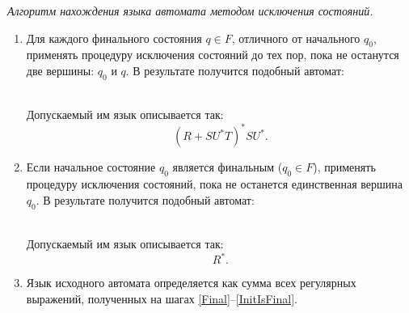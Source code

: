 \renewcommand{\labelenumi}{\theenumi .}
\emph{Алгоритм нахождения языка автомата методом исключения состояний.}
\begin{enumerate}
  \item\label{Final} Для каждого финального состояния $q\in F$, отличного от
  начального $q_0$, применять процедуру исключения состояний до тех пор, пока не останутся
  две вершины: $q_0$ и $q$. В результате получится подобный автомат:\\ 
  \\
Допускаемый им язык описывается так: $$(R+SU^{\ast}T)^{\ast}SU^{\ast}.$$

\item\label{InitIsFinal} Если начальное состояние $q_0$ является финальным
($q_0\in F$), применять процедуру исключения состояний, пока не останется
единственная вершина $q_0$. В результате получится подобный автомат:\\
\\
Допускаемый им язык описывается так:$$R^{\ast}.$$

\item Язык исходного автомата определяется как сумма всех регулярных выражений,
полученных на шагах \eqref{Final}–\eqref{InitIsFinal}.

\end{enumerate}

